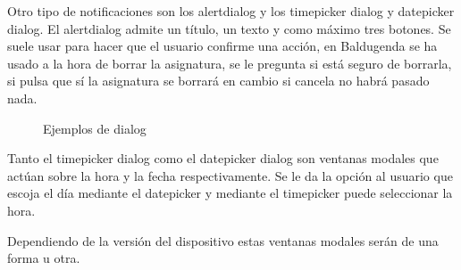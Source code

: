 Otro tipo de notificaciones son los alertdialog y los timepicker dialog y datepicker dialog.
El alertdialog admite un título, un texto y como máximo tres botones. Se suele usar para hacer que el usuario confirme una acción, en Baldugenda se ha usado a la hora de borrar la asignatura, se le pregunta si está seguro de borrarla, si pulsa que sí la asignatura se borrará en cambio si cancela no habrá pasado nada.
\newpage
\begin{figure}[H] 
  \begin{center} 
    \caption{Ejemplos de dialog} 
    \label{fig:EjemplosDialog} 
  \end{center} 
\end{figure}

Tanto el timepicker dialog como el datepicker dialog son ventanas modales que actúan sobre la hora y la fecha respectivamente.
Se le da la opción al usuario que escoja el día mediante el datepicker y mediante el timepicker puede seleccionar la hora.

Dependiendo de la versión del dispositivo estas ventanas modales serán de una forma u otra.

